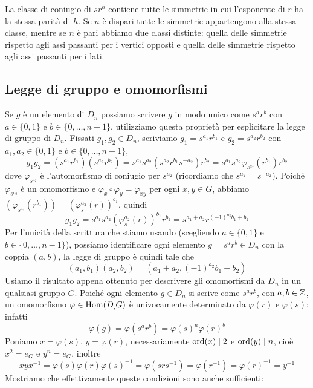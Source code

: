 \documentclass[11pt]{scrartcl}
\begin{document}
\begin{remark}
    La classe di coniugio di $sr^h$ contiene tutte le simmetrie in cui 
    l'esponente di $r$ ha la stessa parità di $h$. Se $n$ è 
    dispari tutte le simmetrie appartengono alla stessa classe,
    mentre se $n$ è pari abbiamo due classi distinte: quella 
    delle simmetrie rispetto agli assi passanti per i vertici opposti e quella 
    delle simmetrie rispetto agli assi passanti per i lati.
\end{remark}


\subsection{Legge di gruppo e omomorfismi}

Se $g$ è un elemento di $D_n$ possiamo scrivere $g$ in modo unico come $s^ar^b$ 
con $a \in \{0, 1\}$ e $b \in \{0, \ldots, n - 1\}$, utilizziamo questa 
proprietà per esplicitare la legge di gruppo di $D_n$. \newline
Fissati $g_1, g_2 \in D_n$, scriviamo $g_1 = s^{a_1}r^{b_1}$ e $g_2 = s^{a_2}r^{b_2}$
con $a_1, a_2 \in \{0, 1\}$ e $b \in \{0, \ldots, n - 1\}$, 
\[
    g_1g_2 = (s^{a_1}r^{b_1})(s^{a_2}r^{b_2}) = s^{a_1}s^{a_2}(s^{a_2}r^{b_1}s^{-a_2})r^{b_2} = 
    s^{a_1}s^{a_2}\varphi_{s^{a_2}}(r^{b_1})r^{b_2}
\]
dove $\varphi_{s^{a_2}}$ è l'automorfismo di coniugio per $s^{a_2}$
(ricordiamo che $s^{a_2} = s^{-a_2}$). Poiché
$\varphi_{s^{a_2}}$ è un omomorfismo e $\varphi_x\circ\varphi_y = \varphi_{xy}$ per ogni $x, y \in G$,
abbiamo $(\varphi_{s^{a_2}}(r^{b_1})) = (\varphi_s^{a_2}(r))^{b_1}$, quindi
\[
    g_1g_2 = s^{a_1}s^{a_2}(\varphi_s^{a_2}(r))^{b_1}r^{b_2} = 
    s^{a_1 + a_2}r^{(-1)^{a_2}b_1 + b_2}
\]
Per l'unicità della scrittura che stiamo usando (scegliendo 
$a \in \{0, 1\}$ e $b \in \{0, \ldots, n - 1\}$), possiamo identificare 
ogni elemento $g = s^ar^b \in D_n$ con la coppia $(a, b)$, la legge di gruppo
è quindi tale che \[
    (a_1, b_1)(a_2, b_2) = (a_1 + a_2, (-1)^{a_2}b_1 + b_2)
\]
\newline 
Usiamo il risultato appena ottenuto per descrivere gli omomorfismi da $D_n$ in 
un qualsiasi gruppo $G$. Poiché ogni elemento $g \in D_n$ si scrive come
$s^ar^b$, con $a, b \in \mathbb Z$, un omomorfismo $\varphi \in \operatorname{Hom}(D_, G)$ è univocamente
determinato da $\varphi(r)$ e $\varphi(s)$: infatti \[
    \varphi(g) = \varphi(s^ar^b) = \varphi(s)^a\varphi(r)^b
\]Poniamo $x = \varphi(s)$, $y = \varphi(r)$, necessariamente $\operatorname{ord}(x) \mid 2$
e $\operatorname{ord}(y)\mid n$, cioè $x^2 = e_G$ e $y^n = e_G$, inoltre \[
    xyx^{-1} = \varphi(s)\varphi(r)\varphi(s)^{-1} = \varphi(srs^{-1}) = 
    \varphi(r^{-1}) = \varphi(r)^{-1} = y^{-1}
\]Mostriamo che effettivamente queste condizioni sono anche sufficienti:
\end{document}
